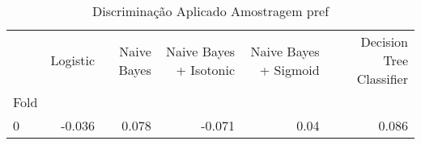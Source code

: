 \begin{table}
\centering
\caption{Discriminação Aplicado Amostragem pref}
\label{Discriminação Aplicado Amostragem pref 8}
\begin{tabular}{lrrrrr}
\toprule
{} &  Logistic &  Naive Bayes &  Naive Bayes + Isotonic &  Naive Bayes + Sigmoid &  Decision Tree Classifier \\
Fold &           &              &                         &                        &                           \\
\midrule
0    &    -0.036 &        0.078 &                  -0.071 &                   0.04 &                     0.086 \\
\bottomrule
\end{tabular}
\end{table}
